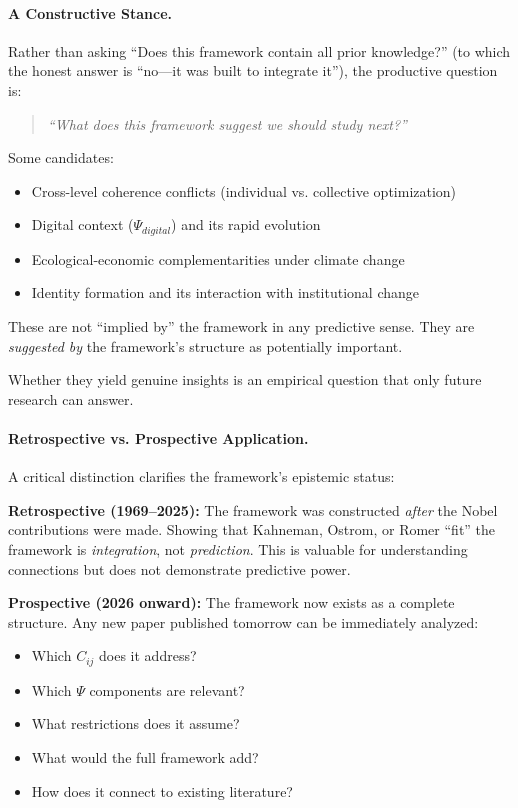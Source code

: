 \paragraph{A Constructive Stance.}
Rather than asking ``Does this framework contain all prior knowledge?''
(to which the honest answer is ``no---it was built to integrate it''),
the productive question is:

\begin{quote}
\emph{``What does this framework suggest we should study next?''}
\end{quote}

Some candidates:
\begin{itemize}
  \item Cross-level coherence conflicts (individual vs. collective optimization)
  \item Digital context ($\Psi_{digital}$) and its rapid evolution
  \item Ecological-economic complementarities under climate change
  \item Identity formation and its interaction with institutional change
\end{itemize}

These are not ``implied by'' the framework in any predictive sense.
They are \emph{suggested by} the framework's structure as potentially important.

Whether they yield genuine insights is an empirical question
that only future research can answer.

\paragraph{Retrospective vs. Prospective Application.}
A critical distinction clarifies the framework's epistemic status:

\textbf{Retrospective (1969--2025):} The framework was constructed \emph{after}
the Nobel contributions were made. Showing that Kahneman, Ostrom, or Romer
``fit'' the framework is \emph{integration}, not \emph{prediction}.
This is valuable for understanding connections but does not demonstrate
predictive power.

\textbf{Prospective (2026 onward):} The framework now exists as a complete
structure. Any new paper published tomorrow can be immediately analyzed:
\begin{itemize}
  \item Which $C_{ij}$ does it address?
  \item Which $\Psi$ components are relevant?
  \item What restrictions does it assume?
  \item What would the full framework add?
  \item How does it connect to existing literature?
\end{itemize}

